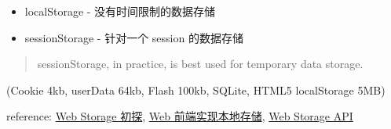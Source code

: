 \begin{itemize}
\item localStorage - 没有时间限制的数据存储
\item sessionStorage - 针对一个 session 的数据存储
\end{itemize}

\begin{quote}
sessionStorage, in practice, is best used for temporary data storage.
\end{quote}

(Cookie 4kb, userData 64kb, Flash 100kb, SQLite, HTML5 localStorage 5MB)

reference: \href{http://segmentfault.com/a/1190000003936684}{Web Storage 初探}, \href{http://segmentfault.com/a/1190000002701423}{Web 前端实现本地存储}, \href{https://html.spec.whatwg.org/multipage/webstorage.html}{Web Storage API}

